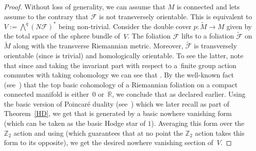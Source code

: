 \documentclass[pdftex]{sigma}
\numberwithin{equation}{section}
\theoremstyle{definition}
\begin{document}
\begin{proof} Without loss of generality, we can assume that $M$ is connected and lets assume to the contrary that $\mathcal{F}$ is not transversely orientable. This is equivalent to $V:=\bigwedge^q (N\mathcal{F})^*$ being non-trivial. Consider the double cover $p\colon \tilde{M}\to M$ given by the total space of the sphere bundle of~$V$. The foliation $\mathcal{F}$ lifts to a foliation $\tilde{\mathcal{F}}$ on $\tilde{M}$ along with the transverse Riemannian metric. Moreover, $\tilde{\mathcal{F}}$ is transversely orientable (since  is trivial) and homologically orientable. To see the latter, note that since  and taking the invariant part with respect to a~finite group action commutes with taking cohomology we can see that . By the well-known fact (see~\cite{E1}) that the top basic cohomology of a Riemannian foliation on a compact connected manifold is either~$0$ or~$\mathbb{R}$, we conclude that  as declared earlier. Using the basic version of Poincar\'e duality (see~\cite{E1}) which we later recall as part of Theorem~\ref{HD}, we get that  is generated by a basic nowhere vanishing form (which can be taken as the basic Hodge star of $1$). Averaging this form over the $\mathbb{Z}_2$ action and using  (which guarantees that at no point the $\mathbb{Z}_2$ action takes this form to its opposite), we get the desired nowhere vanishing section of~$V$.
\end{proof}
\end{document}

